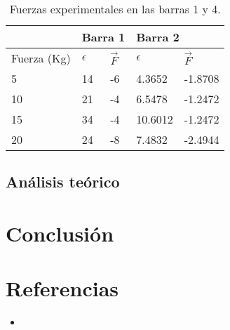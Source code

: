 \documentclass[
	spanish, %
	oneside
]{article}
\begin{document}
	

	\begin{table}
		\centering
		\begin{tabular}{lllll}
		\cline{2-5}
					& \multicolumn{2}{l}{Barra 1} & \multicolumn{2}{l}{Barra 2} \\ \hline
		Fuerza (Kg) & $\epsilon$ & $\vec{F}$ & $\epsilon$ & $\vec{F}$   \\ \hline
		5           & 14        & -6        & 4.3652    & -1.8708   \\
		10          & 21        & -4        & 6.5478    & -1.2472   \\
		15          & 34        & -4        & 10.6012   & -1.2472   \\
		20          & 24        & -8        & 7.4832    & -2.4944   \\ \hline
		\end{tabular}
		\caption{Fuerzas experimentales en las barras 1 y 4.}
		\label{tab:tabla-fuerzas}
	\end{table}

\subsection{Análisis teórico}

\newpage
\section{Conclusión}
	\lipsum[1]

\newpage
\section{Referencias}
	\begin{itemize}
		\item \lipsum[1]
	\end{itemize}

\end{document}
